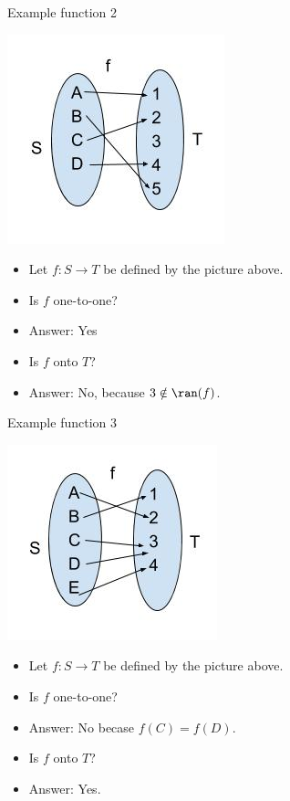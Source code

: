 \documentclass{beamer}
\begin{document}
\begin{frame}{Example function 2}
\begin{center}
\includegraphics[scale=0.25]{function2}
\end{center}

\begin{itemize}
\item Let $f:S\to T$ be defined by the picture above.
\item Is $f$ one-to-one?
\item Answer: Yes
\item Is $f$ onto $T$?
\item Answer: No, because $3\notin\ran(f)$.
\end{itemize}
\end{frame}

\begin{frame}{Example function 3}
\begin{center}
\includegraphics[scale=0.25]{function3}
\end{center}

\begin{itemize}
\item Let $f:S\to T$ be defined by the picture above.
\item Is $f$ one-to-one?
\item Answer: No becase $f(C) = f(D)$.
\item Is $f$ onto $T$?
\item Answer: Yes.
\end{itemize}
\end{frame}
\end{document}
